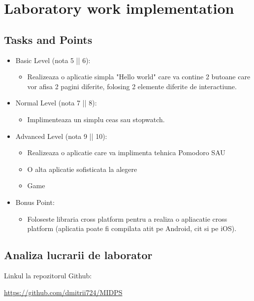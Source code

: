 \section{Laboratory work implementation}

\subsection{Tasks and Points}
\begin{itemize}
	\item Basic Level (nota 5 || 6):
	
	\begin{itemize}
		\item Realizeaza o aplicatie simpla "Hello world" care va contine 2 butoane care vor afisa 2 pagini diferite, folosing 2 elemente diferite de interactiune.
	\end{itemize}
	
	\item Normal Level (nota 7 || 8):
	
	\begin{itemize}
		\item Implimenteaza un simplu ceas sau stopwatch.
	\end{itemize}
	\item Advanced Level (nota 9 || 10):
	
	\begin{itemize}
		\item Realizeaza o aplicatie care va implimenta tehnica Pomodoro SAU
    	\item O alta aplicatie sofisticata la alegere
        \item Game
	\end{itemize}
	\item Bonus Point:
	\begin{itemize}
		\item Foloseste libraria cross platform pentru a realiza o apliacatie cross platform (aplicatia poate fi compilata atit pe Android, cit si pe iOS).
	\end{itemize}
\end{itemize}
    

\subsection{Analiza lucrarii de laborator}

Linkul la repozitorul Github:\\
\begin{center}
\url{https://github.com/dmitrii724/MIDPS}
\end{center}

